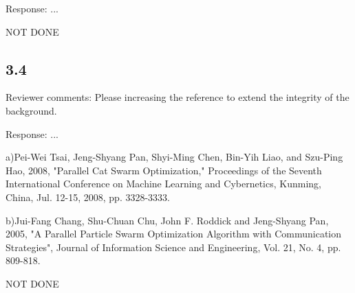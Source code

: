 \documentclass[onecolumn, 12pt]{article}
\begin{document}
Response: ...

NOT DONE

\subsection*{3.4}

Reviewer comments: Please increasing the reference to extend the integrity of
the background.

Response: ...

  a)Pei-Wei Tsai, Jeng-Shyang Pan, Shyi-Ming Chen, Bin-Yih Liao, and Szu-Ping
Hao, 2008, "Parallel Cat Swarm Optimization," Proceedings of the Seventh
International Conference on Machine Learning and Cybernetics, Kunming, China,
Jul. 12-15, 2008, pp. 3328-3333.

  b)Jui-Fang Chang, Shu-Chuan Chu, John F. Roddick and Jeng-Shyang Pan, 2005,
"A Parallel Particle Swarm Optimization Algorithm with Communication
Strategies", Journal of Information Science and Engineering, Vol. 21, No. 4,
pp. 809-818.

NOT DONE
\end{document}
